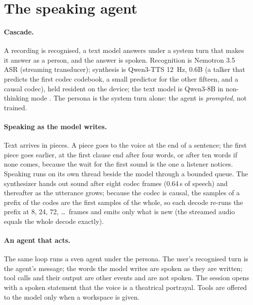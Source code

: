 
\section{The speaking agent}\label{sec:system}

\paragraph{Cascade.}
A recording is recognised, a text model answers under a system turn that makes it answer as a person, and the
answer is spoken. Recognition is Nemotron 3.5 ASR (streaming transducer); synthesis is Qwen3-TTS 12~Hz, 0.6B
(a talker that predicts the first codec codebook, a small predictor for the other fifteen, and a causal codec),
held resident on the device; the text model is Qwen3-8B in non-thinking mode \citep{qwen3}. The persona is the system
turn alone: the agent is \emph{prompted}, not trained.

\paragraph{Speaking as the model writes.}
Text arrives in pieces. A piece goes to the voice at the end of a sentence; the first piece goes earlier, at the first clause
end after four words, or after ten words if none comes, because the wait for the first sound is the one a listener notices.
Speaking runs on its own thread beside the model through a bounded queue. The synthesizer hands out sound after
eight codec frames (0.64\,s of speech) and thereafter as the utterance grows; because the codec is causal, the samples of a prefix of
the codes are the first samples of the whole, so each decode re-runs the prefix at 8, 24, 72, \ldots\ frames and emits only
what is new (the streamed audio equals the whole decode exactly).

\paragraph{An agent that acts.}
The same loop runs a sven agent under the persona. The user's recognised turn is the agent's message; the words the
model writes are spoken as they are written; tool calls and their output are other events and are not spoken. The session
opens with a spoken statement that the voice is a theatrical portrayal. Tools are offered to the model only when a workspace is given.

